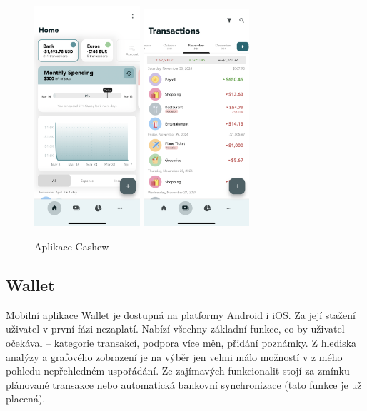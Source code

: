 \documentclass[
  biblatex,
  figures=true,
  tables=false,
  glossaries,
  index
]{kidiplom}
\begin{document}
\begin{figure}
  \centering
    \includegraphics[width=0.35\textwidth]{images/cashew2.PNG}
    \hspace{10px}
    \includegraphics[width=0.35\textwidth]{images/cashew1.PNG}
  \caption{Aplikace Cashew}
\end{figure}

\subsection{Wallet}
Mobilní aplikace Wallet \cite{wallet} je dostupná na platformy Android i iOS. Za její stažení uživatel v první fázi nezaplatí. Nabízí všechny základní funkce, co by uživatel očekával -- kategorie transakcí, podpora více měn, přidání poznámky. Z hlediska analýzy a grafového zobrazení je na výběr jen velmi málo možností v z mého pohledu nepřehledném uspořádání. Ze zajímavých funkcionalit stojí za zmínku plánované transakce nebo automatická bankovní synchronizace (tato funkce je už placená).
\end{document}
